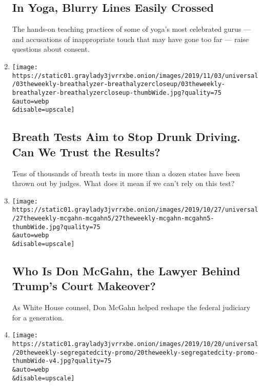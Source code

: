 \begin{enumerate}
  \hypertarget{in-yoga-blurry-lines-easily-crossed}{%
  \subsection{In Yoga, Blurry Lines Easily
  Crossed}\label{in-yoga-blurry-lines-easily-crossed}}

  The hands-on teaching practices of some of yoga's most celebrated
  gurus --- and accusations of inappropriate touch that may have gone
  too far --- raise questions about consent.
\item
  \href{/2019/11/01/the-weekly/breathalyzer-drunk-driving.html}{}

  \texttt{[image: https://static01.graylady3jvrrxbe.onion/images/2019/11/03/universal/03theweekly-breathalyzer-breathalyzercloseup/03theweekly-breathalyzer-breathalyzercloseup-thumbWide.jpg?quality=75\\\&auto=webp\\\&disable=upscale]}

  \hypertarget{breath-tests-aim-to-stop-drunk-driving-can-we-trust-the-results}{%
  \subsection{Breath Tests Aim to Stop Drunk Driving. Can We Trust the
  Results?}\label{breath-tests-aim-to-stop-drunk-driving-can-we-trust-the-results}}

  Tens of thousands of breath tests in more than a dozen states have
  been thrown out by judges. What does it mean if we can't rely on this
  test?
\item
  \href{/2019/10/25/the-weekly/don-mcgahn-trump-courts.html}{}

  \texttt{[image: https://static01.graylady3jvrrxbe.onion/images/2019/10/27/universal/27theweekly-mcgahn-mcgahn5/27theweekly-mcgahn-mcgahn5-thumbWide.jpg?quality=75\\\&auto=webp\\\&disable=upscale]}

  \hypertarget{who-is-don-mcgahn-the-lawyer-behind-trumps-court-makeover}{%
  \subsection{Who Is Don McGahn, the Lawyer Behind Trump's Court
  Makeover?}\label{who-is-don-mcgahn-the-lawyer-behind-trumps-court-makeover}}

  As White House counsel, Don McGahn helped reshape the federal
  judiciary for a generation.
\item
  \href{/2019/10/18/the-weekly/nyc-schools-segregation.html}{}

  \texttt{[image: https://static01.graylady3jvrrxbe.onion/images/2019/10/20/universal/20theweekly-segregatedcity-promo/20theweekly-segregatedcity-promo-thumbWide-v4.jpg?quality=75\\\&auto=webp\\\&disable=upscale]}


\end{enumerate}
